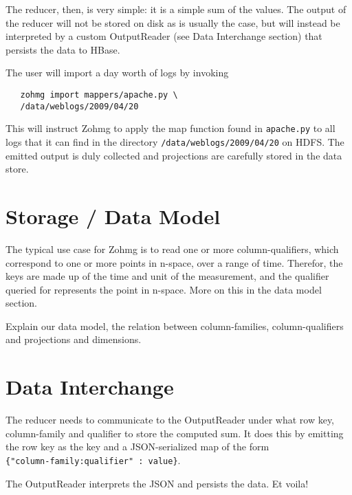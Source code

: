 
The reducer, then, is very simple: it is a simple sum of the values. The output
of the reducer will not be stored on disk as is usually the case, but will
instead be interpreted by a custom OutputReader (see Data Interchange section)
that persists the data to HBase.

The user will import a day worth of logs by invoking

\begin{verbatim}
   zohmg import mappers/apache.py \
   /data/weblogs/2009/04/20
\end{verbatim}

This will instruct Zohmg to apply the map function found in \texttt{apache.py}
to all logs that it can find in the directory \texttt{/data/weblogs/2009/04/20}
on HDFS. The emitted output is duly collected and projections are carefully
stored in the data store.


\section{Storage / Data Model}

The typical use case for Zohmg is to read one or more column-qualifiers,
which correspond to one or more points in n-space, over a range of time.
Therefor, the keys are made up of the time and unit of the measurement,
and the qualifier queried for represents the point in n-space. More on
this in the data model section.

Explain our data model, the relation between column-families, column-qualifiers
and projections and dimensions.


\section{Data Interchange}

The reducer needs to communicate to the OutputReader under what row key,
column-family and qualifier to store the computed sum. It does this by
emitting the row key as the key and a JSON-serialized map of the form \\
\texttt{\{"column-family:qualifier" : value\}}.

The OutputReader interprets the JSON and persists the data. Et voila!


